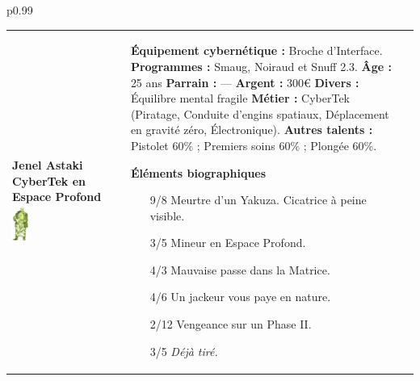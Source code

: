 \documentclass[11pt,twoside,a4paper]{article}
\begin{document}
\begin{longtable}[ht]{ p{} }
		\hline
	\begin{tabular}[h]{ p{} p{} p{} }
		\textbf{Jenel Astaki}										\newline
		\textbf{\small CyberTek en Espace Profond}					\newline
			\newline
		\includegraphics[width=0.15\textwidth]{img/personnageJenelAstaki.jpg}		
			\newline
			
		& %
			
		\textbf{{\'E}quipement cybern{\'e}tique : }Broche d'Interface.	\newline
		\textbf{Programmes : }Smaug, Noiraud et Snuff 2.3.				\newline
		\textbf{{\^A}ge : } 25 ans 										\newline
		\textbf{Parrain : } --- 										\newline
		\textbf{Argent : } 300\euro 									\newline
		\textbf{Divers : } {\'E}quilibre mental fragile					\newline
		\textbf{M{\'e}tier : } CyberTek (Piratage, Conduite d'engins spatiaux, D{\'e}placement en gravit{\'e} z{\'e}ro, {\'E}lectronique). \newline
		\textbf{Autres talents : } Pistolet 60\% ; Premiers soins 60\%  ; Plong{\'e}e 60\%. \newline
		
		\textbf{{\'E}l{\'e}ments biographiques}
		\begin{itemize}
			\item[9/8] Meurtre d'un Yakuza. Cicatrice {\`a} peine visible. 
			\item[3/5] Mineur en Espace Profond. 
			\item[4/3] Mauvaise passe dans la Matrice. 
			\item[4/6] Un jackeur vous paye en nature. 
			\item[2/12] Vengeance sur un Phase II. 
			\item[3/5] \emph{D{\'e}j{\`a} tir{\'e}. }
		\end{itemize}
		

\end{tabular}
\end{longtable}
\end{document}
